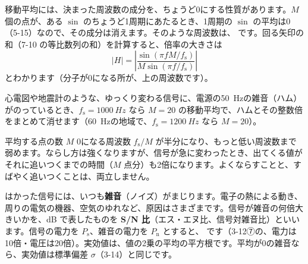 移動平均には、決まった周波数の成分を、ちょうど0にする性質があります。$M$ 個の点が、ある $\sin$ のちょうど1周期にあたるとき、1周期の $\sin$ の平均は0（5-15）なので、その成分は消えます。そのような周波数は、
です。回る矢印の和（7-10 の等比数列の和）を計算すると、倍率の大きさは
\[|H|=\left|\frac{\sin(\pi fM/f_{\mathrm s})}{M\sin(\pi f/f_{\mathrm s})}\right|\]
とわかります（分子が0になる所が、上の周波数です）。

\begin{bkfigure}
\label{ph:波-11:fig-idou}
\end{bkfigure}

\noindent 心電図や地震計のような、ゆっくり変わる信号に、電源の\qty{50}{Hz}の雑音（ハム）がのっているとき、$f_{\mathrm s}=\qty{1000}{Hz}$ なら $M=20$ の移動平均で、ハムとその整数倍をまとめて消せます（\qty{60}{Hz}の地域で、$f_{\mathrm s}=\qty{1200}{Hz}$ なら $M=20$）。

\begin{phbaisuru}{平均する点の数 $M$}
0になる周波数 $f_{\mathrm s}/M$ が半分になり、もっと低い周波数まで弱めます。ならし方は強くなりますが、信号が急に変わったとき、出てくる値がそれに追いつくまでの時間（$M$ 点分）も2倍になります。よくならすことと、すばやく追いつくことは、両立しません。
\end{phbaisuru}

\label{ph:波-11:sec7}
はかった信号には、いつも\textbf{雑音}（ノイズ）がまじります。電子の熱による動き、周りの電気の機器、空気のゆれなど、原因はさまざまです。信号が雑音の何倍大きいかを、dB で表したものを \textbf{S/N 比}（エス・エヌ比、信号対雑音比）といいます。信号の電力を $P_{\mathrm s}$、雑音の電力を $P_{\mathrm n}$ とすると、
です（3-12⑦の、電力は10倍・電圧は20倍）。実効値は、値の2乗の平均の平方根です。平均が0の雑音なら、実効値は標準偏差 $\sigma$（3-14）と同じです。

